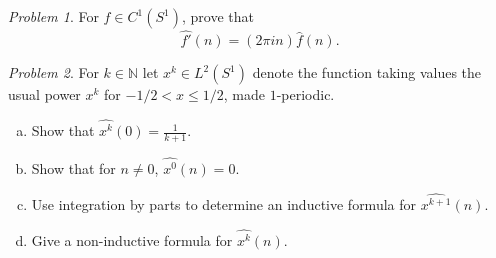 \documentclass[11pt,twoside]{amsart}
\theoremstyle{plain}
\theoremstyle{remark}
\newtheorem{prob}{Problem}
\theoremstyle{definition}
\theoremstyle{definition}
\newcommand{\NN}{\mathbb{N}}
\begin{document}

\begin{prob}
For $f\in C^1(S^1)$, prove that
\[
  \widehat{f'}(n) = (2\pi i n)\hat f(n).
\]
\end{prob}


\begin{prob}
For $k\in \NN$ let $x^k\in L^2(S^1)$ denote the function taking values the usual power $x^k$ for $-1/2<x\le 1/2$, made $1$-periodic.
\begin{enumerate}[(a)]
\item Show that $\widehat{x^k}(0) = \frac{1}{k+1}$.
\item Show that for $n\ne 0$, $\widehat{x^0}(n) = 0$.
\item Use integration by parts to determine an inductive formula for $\widehat{x^{k+1}}(n)$.
\item Give a non-inductive formula for $\widehat{x^k}(n)$.
\end{enumerate}
\end{prob}

\end{document}
